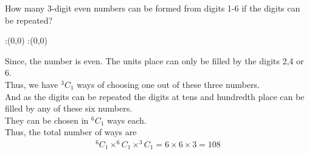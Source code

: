 




\question[3] How many 3-digit even numbers can be formed from digits 1-6 if the digits can be repeated?


\watchout

\ifprintanswers
  \begin{marginfigure}
      :(0,0)
      :(0,0)
    \figdrawbegin{}
      \figdrawline [100,101]
    \figdrawend
    \figvisu{\figBoxA}{}{%
    }
    \centerline{\box\figBoxA}
  \end{marginfigure}
\fi 

\begin{solution}[\mcq]
Since, the number is even. The units place can only be filled by the digits {2},{4} or {6}.
\\
Thus, we have $^{3}C_{1}$ ways of choosing one out of these three numbers.\\
And as the digits can be repeated the digits at tens and hundredth place can be filled by any of these six numbers. \\
They can be chosen in $^{6}C_{1}$ ways each. \\
Thus, the total number of ways are \\
\begin{align}
^{6}{C}_{1} \times ^{6}{C}_{1} \times ^{3}{C}_{1} = 6 \times 6 \times 3 = 108
\end{align}
\end{solution}


